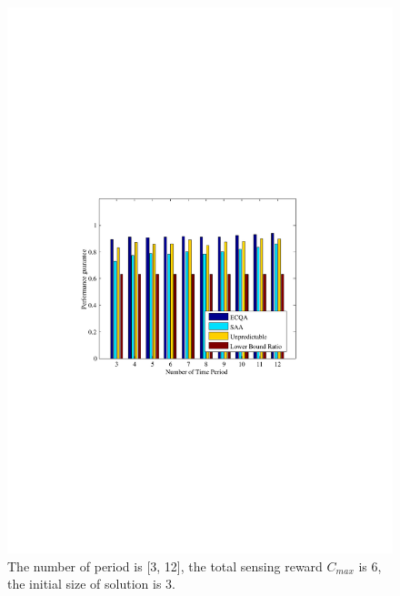 \documentclass[journal]{IEEEtran}
\begin{document}
\begin{figure}[h]
	\centering
	\includegraphics[width=0.81\linewidth]{figure8.pdf}
	\caption{The number of period is [3, 12], the total sensing reward $C_{max}$ is 6, the initial size of solution is 3.}
	\label{fig:figure7}
\end{figure}
\end{document}
